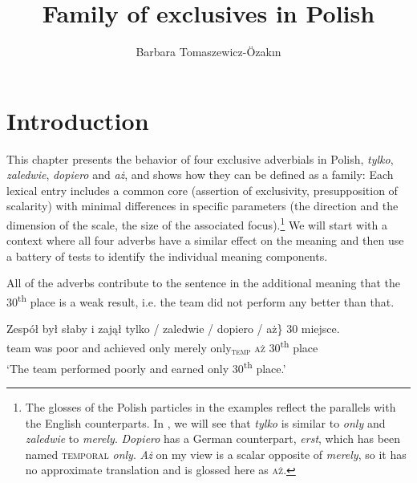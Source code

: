\documentclass[output=paper,colorlinks,citecolor=brown]{langscibook}
\author{Barbara Tomaszewicz-Özakın\orcid{0000-0002-6388-8778}\affiliation{RWTH Aachen University}}
\title{Family of exclusives in Polish}
\begin{document}
\maketitle

%


\section{Introduction}

This chapter presents the behavior of four exclusive adverbials in Polish, \textit{tylko}, \textit{zaledwie}, \textit{dopiero} and \textit{aż}, and shows how they can be defined as a family: Each lexical entry includes a common core (assertion of exclusivity, presupposition of scalarity) with minimal differences in specific parameters (the direction and the dimension of the scale, the size of the associated focus).\footnote{The glosses of the Polish particles in the examples reflect the parallels with the English counterparts. In , we will see that \textit{tylko} is similar to \textit{only} and \textit{zaledwie} to \textit{merely}. \textit{Dopiero} has a German counterpart, \textit{erst}, which has been named \textsc{temporal} \textit{only}. \textit{Aż} on my view is a scalar opposite of \textit{merely}, so it has no approximate translation and is glossed here as \textsc{aż}.} We will start with a context where all four adverbs have a similar effect on the meaning and then use a battery of tests to identify the individual meaning components.

All of the adverbs contribute to the sentence in  the additional meaning that the 30\textsuperscript{th} place is a weak result, i.e. the team did not perform any better than that.

\ea\label{ex:tom:1} 
\gll Zespół był     słaby  i         zajął         \minsp{\{} tylko / zaledwie / dopiero / aż\}   30   miejsce.\\
team    was  poor    and    achieved  {} only {} merely {} only\textsubscript{\textsc{temp}} {} \textsc{aż}     30\textsuperscript{th}  place\\
\glt `The team performed poorly and earned only 30\textsuperscript{th} place.'
\z
\end{document}
